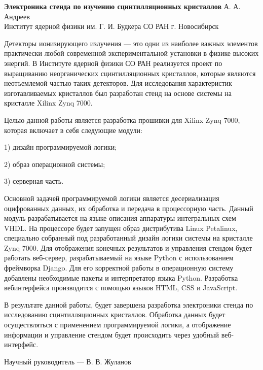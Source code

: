 \documentclass[10pt,a5paper]{scrartcl}
\begin{document}
    \begin{center}
        \textbf{Электроника стенда по изучению сцинтилляционных кристаллов}
        \bigbreak
        А. А. Андреев \\
        Институт ядерной физики им. Г. И. Будкера СО РАН г. Новосибирск
    \end{center}

    Детекторы ионизирующего излучения --- это одни из наиболее важных элементов практически любой современной экспериментальной установки в физике высоких энергий. В Институте ядерной физики СО РАН реализуется проект по выращиванию неорганических сцинтилляционных кристаллов, которые являются неотъемлемой частью таких детекторов. Для исследования характеристик изготавливаемых кристаллов был разработан стенд на основе системы на кристалле Xilinx Zynq 7000. \par
    Целью данной работы является разработка прошивки для Xilinx Zynq 7000, которая включает в себя следующие модули:\par
    1) дизайн программируемой логики;\par
    2) образ операционной системы;\par
    3) серверная часть.\par
    Основной задачей программируемой логики является десериализация оцифрованных данных, их обработка и передача в процессорную часть. Данный модуль разрабатывается на языке описания аппаратуры интегральных схем VHDL. На процессоре будет запущен образ дистрибутива Linux Petalinux, специально собранный под разработанный дизайн логики системы на кристалле Zynq 7000. Для отображения конечных результатов и управления стендом будет работать веб-сервер, разрабатываемый на языке Python с использованием фреймворка Django. Для его корректной работы в операционную систему добавлены необходимые пакеты и интерпретатор языка Python. Разработка вебинтерфейса производится с помощью языков HTML, CSS и JavaScript.\par
    В результате данной работы, будет завершена разработка электроники стенда по исследованию сцинтилляционных кристаллов. Обработка данных будет осуществляться с применением программируемой логики, а отображение информации и управление стендом будет происходить через удобный веб-интерфейс.\par
\bigbreak
\begin{center}
    Научный руководитель --- В. В. Жуланов 
\end{center} 
\end{document}
